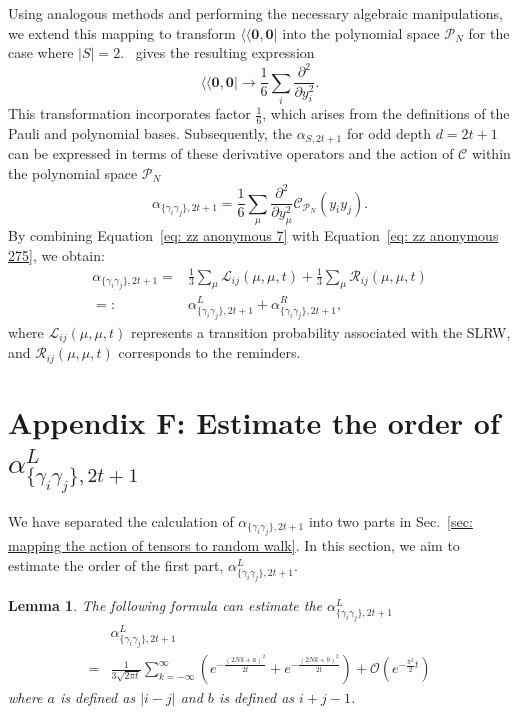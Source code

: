 \documentclass[journal=jctcce,a4paper,manuscript=article]{achemso}
\newtheorem{lemma}{Lemma}
\newcommand{\alpl}{\alpha_{\{\gamma_i\gamma_j\}, 2t+1}^{L}}
\newcommand{\supbra}[1]{\langle\langle #1 |}
\begin{document}
Using analogous methods and performing the necessary algebraic manipulations,
we extend this mapping to transform \(\supbra{\bm{0}, \bm{0}}\) into the
polynomial space \(\mathcal{P}_N\) for the case where \(|S| = 2\). \ gives the
resulting expression \begin{equation}
  \supbra{\bm 0,\bm 0} \to \frac{1}{6} \sum_{i} \frac{\partial^2}{\partial y_i^2 }.
\end{equation}
This transformation incorporates factor \(\frac{1}{6}\), which arises from the definitions of the Pauli and polynomial bases. Subsequently, the \(\alpha_{S,2t+1}\) for odd depth \(d = 2t + 1\) can be expressed in terms of these derivative operators and the action of \(\mathcal{C}\) within the polynomial space \(\mathcal{P}_N\)
\begin{equation}
  \alpha_{\{\gamma_i\gamma_j\},2t+1} = \frac{1}{6} \sum_{\mu} \frac{\partial^2}{\partial y_\mu^2 } \mathcal{C}_{\mathcal{P}_N} (y_i y_j).
  \label{eq: zz anonymous 275}
\end{equation}
By combining Equation~\eqref{eq: zz anonymous 7} with Equation~\eqref{eq: zz anonymous 275}, we obtain:
\begin{align}
  \alpha_{\{\gamma_i\gamma_j\},2t+1} = & \frac{1}{3} \sum_\mu \mathscr{L}_{ij} (\mu, \mu, t) + \frac{1}{3} \sum_\mu \mathscr{R}_{ij} (\mu, \mu, t) \\
  =:                                   & \alpha_{\{\gamma_i\gamma_j\}, 2t+1}^{L} + \alpha_{\{\gamma_i\gamma_j\}, 2t+1}^{R},
  \label{eq: zz anonymous 24}
\end{align}
where \(\mathscr{L}_{ij} (\mu, \mu, t)\) represents a transition probability associated with the SLRW, and \(\mathscr{R}_{ij} (\mu, \mu, t)\) corresponds to the reminders.

\section{Appendix F: Estimate the order of $\alpha_{\{\gamma_i\gamma_j\}, 2t+1}^{L}$}
\label{sec: estimate the order of alpl}
We have separated the calculation of $\alpha_{\{\gamma_i\gamma_j\},2t+1}$ into two parts in Sec.~\ref{sec: mapping the action of tensors to random walk}. In this section, we aim to estimate the order of the first part, $\alpl$.
\begin{lemma}
  \label{theorem: order of alpha l}
  The following formula can estimate the $\alpl$
  \begin{equation}
    \begin{aligned}
       & \alpl \\ =& \frac{1}{3\sqrt{2\pi t}}  \sum_{k=-\infty}^{\infty} \left(e^{-\frac{(2Nk+a)^2}{2t}} + e^{-\frac{(2Nk+b)^2}{2t}} \right)+\mathcal{O}\left(e^{-\frac{\pi^2}{2}t}\right)
    \end{aligned}
  \end{equation}
  where $a$ is defined as $|i-j|$ and $b$ is defined as $i+j-1$.
\end{lemma}
\end{document}
